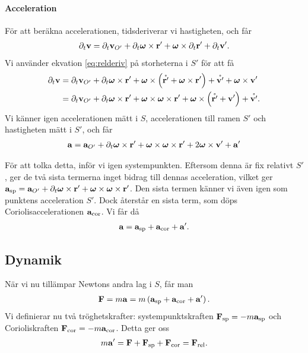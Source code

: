 \paragraph{Acceleration}
För att beräkna accelerationen, tidsderiverar vi hastigheten, och får
\begin{align*}
	\partial_{t}\vb{v} = \partial_{t}\vb{v}_{O'} + \partial_{t}\vb*{\omega}\times\vb{r}' + \vb*{\omega}\times\partial_{t}\vb{r}' + \partial_{t}\vb{v}'.
\end{align*}
Vi använder ekvation \ref{eq:relderiv} på storheterna i $S'$ för att få
\begin{align*}
	\partial_{t}\vb{v} &= \partial_{t}\vb{v}_{O'} + \partial_{t}\vb*{\omega}\times\vb{r}' + \vb*{\omega}\times\left(\mathring{\vb{r}'} + \vb*{\omega}\times\vb{r}'\right) + \mathring{\vb{v}'} + \vb*{\omega}\times\vb{v}' \\
	                &= \partial_{t}\vb{v}_{O'} + \partial_{t}\vb*{\omega}\times\vb{r}' + \vb*{\omega}\times\vb*{\omega}\times\vb{r}' + \vb*{\omega}\times\left(\mathring{\vb{r}'} + \vb{v}'\right) + \mathring{\vb{v}'}.
\end{align*}
Vi känner igen accelerationen mätt i $S$, accelerationen till ramen $S'$ och hastigheten mätt i $S'$, och får
\begin{align*}
	\vb{a} = \vb{a}_{O'} + \partial_{t}\vb*{\omega}\times\vb{r}' + \vb*{\omega}\times\vb*{\omega}\times\vb{r}' + 2\vb*{\omega}\times\vb{v}' + \vb{a}'
\end{align*}

För att tolka detta, inför vi igen systempunkten. Eftersom denna är fix relativt $S'$, ger de två sista termerna inget bidrag till dennas acceleration, vilket ger $\vb{a}_{\text{sp}} = \vb{a}_{O'} + \partial_{t}\vb*{\omega}\times\vb{r}' + \vb*{\omega}\times\vb*{\omega}\times\vb{r}'$. Den sista termen känner vi även igen som punktens acceleration $S'$. Dock återstår en sista term, som döps Coriolisaccelerationen $\vb{a}_{\text{cor}}$. Vi får då
\begin{align*}
	\vb{a} = \vb{a}_{\text{sp}} + \vb{a}_{\text{cor}} + \vb{a}'.
\end{align*}

\subsection{Dynamik}

När vi nu tillämpar Newtons andra lag i $S$, får man
\begin{align*}
	\vb{F} = m\vb{a} = m\left(\vb{a}_{\text{sp}} + \vb{a}_{\text{cor}} + \vb{a}'\right).
\end{align*}
Vi definierar nu två tröghetskrafter: systempunktskraften $\vb{F}_{\text{sp}} = - m\vb{a}_{\text{sp}}$ och Corioliskraften $\vb{F}_{\text{cor}} = - m\vb{a}_{\text{cor}}$. Detta ger oss
\begin{align*}
	m\vb{a}' = \vb{F} + \vb{F}_{\text{sp}} + \vb{F}_{\text{cor}} = \vb{F}_{\text{rel}}.
\end{align*}

